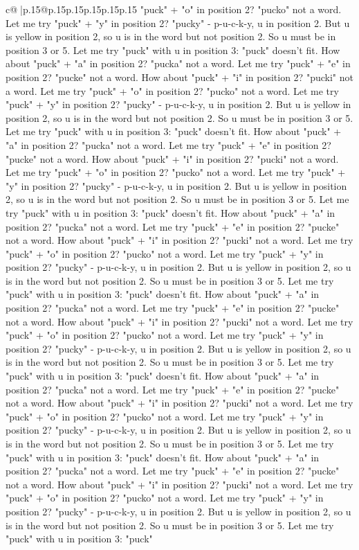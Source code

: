 \documentclass{article}
\begin{document}
{\begin{supertabular}{c@{$\;$}|p{.15\linewidth}@{}p{.15\linewidth}p{.15\linewidth}p{.15\linewidth}p{.15\linewidth}p{.15\linewidth}}
{{{"puck" + "o" in position 2? "pucko" not a word. Let me try "puck" + "y" in position 2? "pucky" {-} p{-}u{-}c{-}k{-}y, u in position 2. But u is yellow in position 2, so u is in the word but not position 2. So u must be in position 3 or 5. Let me try "puck" with u in position 3: "puck" doesn't fit. How about "puck" + "a" in position 2? "pucka" not a word. Let me try "puck" + "e" in position 2? "pucke" not a word. How about "puck" + "i" in position 2? "pucki" not a word. Let me try "puck" + "o" in position 2? "pucko" not a word. Let me try "puck" + "y" in position 2? "pucky" {-} p{-}u{-}c{-}k{-}y, u in position 2. But u is yellow in position 2, so u is in the word but not position 2. So u must be in position 3 or 5. Let me try "puck" with u in position 3: "puck" doesn't fit. How about "puck" + "a" in position 2? "pucka" not a word. Let me try "puck" + "e" in position 2? "pucke" not a word. How about "puck" + "i" in position 2? "pucki" not a word. Let me try "puck" + "o" in position 2? "pucko" not a word. Let me try "puck" + "y" in position 2? "pucky" {-} p{-}u{-}c{-}k{-}y, u in position 2. But u is yellow in position 2, so u is in the word but not position 2. So u must be in position 3 or 5. Let me try "puck" with u in position 3: "puck" doesn't fit. How about "puck" + "a" in position 2? "pucka" not a word. Let me try "puck" + "e" in position 2? "pucke" not a word. How about "puck" + "i" in position 2? "pucki" not a word. Let me try "puck" + "o" in position 2? "pucko" not a word. Let me try "puck" + "y" in position 2? "pucky" {-} p{-}u{-}c{-}k{-}y, u in position 2. But u is yellow in position 2, so u is in the word but not position 2. So u must be in position 3 or 5. Let me try "puck" with u in position 3: "puck" doesn't fit. How about "puck" + "a" in position 2? "pucka" not a word. Let me try "puck" + "e" in position 2? "pucke" not a word. How about "puck" + "i" in position 2? "pucki" not a word. Let me try "puck" + "o" in position 2? "pucko" not a word. Let me try "puck" + "y" in position 2? "pucky" {-} p{-}u{-}c{-}k{-}y, u in position 2. But u is yellow in position 2, so u is in the word but not position 2. So u must be in position 3 or 5. Let me try "puck" with u in position 3: "puck" doesn't fit. How about "puck" + "a" in position 2? "pucka" not a word. Let me try "puck" + "e" in position 2? "pucke" not a word. How about "puck" + "i" in position 2? "pucki" not a word. Let me try "puck" + "o" in position 2? "pucko" not a word. Let me try "puck" + "y" in position 2? "pucky" {-} p{-}u{-}c{-}k{-}y, u in position 2. But u is yellow in position 2, so u is in the word but not position 2. So u must be in position 3 or 5. Let me try "puck" with u in position 3: "puck" doesn't fit. How about "puck" + "a" in position 2? "pucka" not a word. Let me try "puck" + "e" in position 2? "pucke" not a word. How about "puck" + "i" in position 2? "pucki" not a word. Let me try "puck" + "o" in position 2? "pucko" not a word. Let me try "puck" + "y" in position 2? "pucky" {-} p{-}u{-}c{-}k{-}y, u in position 2. But u is yellow in position 2, so u is in the word but not position 2. So u must be in position 3 or 5. Let me try "puck" with u in position 3: "puck" }}}
\end{supertabular}}
\end{document}
